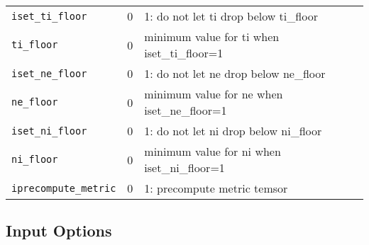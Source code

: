\begin{tabular}{llp{4in}}
 \texttt{iset\_ti\_floor} & 0 & 1: do not let ti drop below ti\_floor \\
  \texttt{ti\_floor}	   & 0 & minimum value for ti when iset\_ti\_floor=1 \\

 \texttt{iset\_ne\_floor} & 0 & 1: do not let ne drop below ne\_floor \\
  \texttt{ne\_floor}	   & 0 & minimum value for ne when iset\_ne\_floor=1 \\

 \texttt{iset\_ni\_floor} & 0 & 1: do not let ni drop below ni\_floor \\
  \texttt{ni\_floor}	   & 0 & minimum value for ni when iset\_ni\_floor=1 \\




  \texttt{iprecompute\_metric} & 0 & 1: precompute metric temsor
\end{tabular}

\subsection{Input Options}

